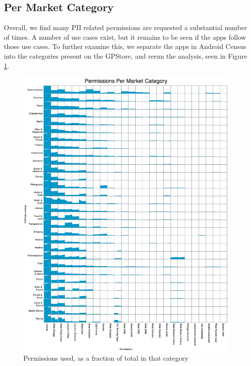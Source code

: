 \subsection{Per Market Category}
Overall, we find many PII related permissions are requested a substantial number of times. A number of use cases exist, but it remains to be seen if the apps follow those use cases. To further examine this, we separate the apps in Android Census into the categories present on the GPStore, and rerun the analysis, seen in Figure \ref{fig:permissionspercategory}.

\begin{figure}[h]
\begin{center}
\includegraphics[width=1.0\columnwidth]{figs/PermissionsforMarketCategory}
\caption{Permissions used, as a fraction of total in that category}
\label{fig:permissionspercategory}
\end{center}
\end{figure}

